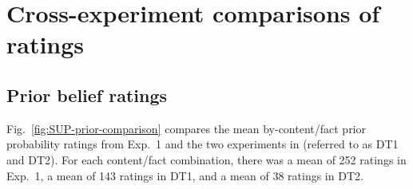 \documentclass[11pt,fleqn]{article}
\newcommand{\6}{\mbox{$[\hspace*{-.6mm}[$}}
\newcommand{\9}{\mbox{$]\hspace*{-.6mm}]$}}
\begin{document}
\newpage

\section{Cross-experiment comparisons of ratings}\label{a-replication}



\subsection{Prior belief ratings}

Fig.~\ref{fig:SUP-prior-comparison} compares the mean by-content/fact prior probability ratings from Exp.~1 and the two experiments in \citealt{degen-tonhauser-openmind} (referred to as DT1 and DT2). For each content/fact combination, there was a mean of 252 ratings in Exp.~1, a mean of 143 ratings in DT1, and a mean of 38 ratings in DT2.
\end{document}
